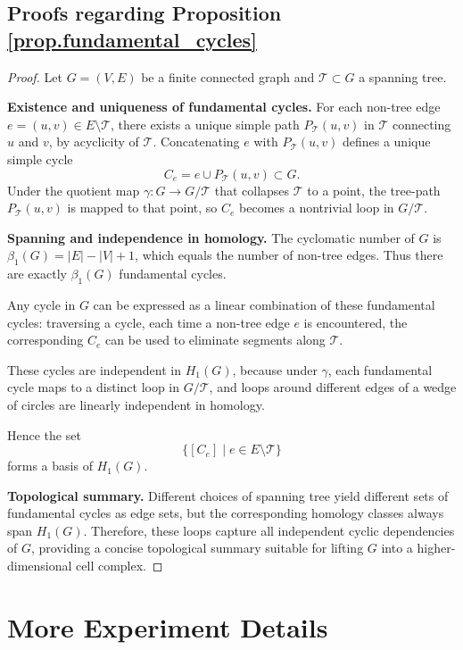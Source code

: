 \subsection{Proofs regarding Proposition \ref{prop.fundamental_cycles}}
\label{app.proof.fundamental_cycles}
\begin{proof}
Let $G=(V,E)$ be a finite connected graph and $\mathcal{T} \subset G$ a spanning tree.

\textbf{Existence and uniqueness of fundamental cycles.}  
For each non-tree edge $e=(u,v) \in E \setminus \mathcal{T}$, there exists a unique simple path $P_{\mathcal{T}}(u,v)$ in $\mathcal{T}$ connecting $u$ and $v$, by acyclicity of $\mathcal{T}$.  
Concatenating $e$ with $P_{\mathcal{T}}(u,v)$ defines a unique simple cycle 
\[
C_e = e \cup P_{\mathcal{T}}(u,v) \subset G.
\]  
Under the quotient map $\gamma: G \to G/\mathcal{T}$ that collapses $\mathcal{T}$ to a point, the tree-path $P_{\mathcal{T}}(u,v)$ is mapped to that point, so $C_e$ becomes a nontrivial loop in $G/\mathcal{T}$.

\textbf{Spanning and independence in homology.}  
The cyclomatic number of $G$ is $\beta_1(G) = |E| - |V| + 1$, which equals the number of non-tree edges.  
Thus there are exactly $\beta_1(G)$ fundamental cycles.  

Any cycle in $G$ can be expressed as a linear combination of these fundamental cycles: traversing a cycle, each time a non-tree edge $e$ is encountered, the corresponding $C_e$ can be used to eliminate segments along $\mathcal{T}$.  

These cycles are independent in $H_1(G)$, because under $\gamma$, each fundamental cycle maps to a distinct loop in $G/\mathcal{T}$, and loops around different edges of a wedge of circles are linearly independent in homology.  

Hence the set 
\[
\{ [C_e] \mid e \in E \setminus \mathcal{T} \}
\]
forms a basis of $H_1(G)$.

\textbf{Topological summary.}  
Different choices of spanning tree yield different sets of fundamental cycles as edge sets, but the corresponding homology classes always span $H_1(G)$.  
Therefore, these loops capture all independent cyclic dependencies of $G$, providing a concise topological summary suitable for lifting $G$ into a higher-dimensional cell complex.
\end{proof}




\section{More Experiment Details}
